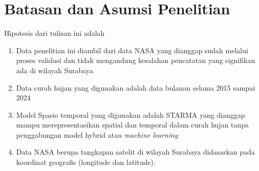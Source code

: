 \section{Batasan dan Asumsi Penelitian}
Hipotesis dari tulisan ini adalah
\begin{enumerate}
    \item Data penelitian ini diambil dari data NASA yang dianggap sudah melalui proses validasi dan tidak mengandung kesalahan pencatatan yang signifikan ada di wilayah Surabaya
    \item Data curah hujan yang digunakan adalah data bulanan selama 2015 sampai 2024
    \item Model Spasio temporal yang digunakan adalah STARMA yang dianggap mampu merepresentasikan spatial dan temporal dalam curah hujan tanpa penggabungan model hybrid atau \textit{machine learning}
    \item Data NASA berupa tangkapan satelit di wilayah Surabaya didasarkan pada koordinat geografis (longitude dan latitude).
\end{enumerate}